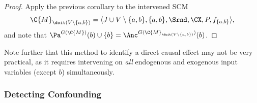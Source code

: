 \begin{proof}
  Apply the previous corollary to the intervened SCM 
  $$\C{M}_{\doit(V\setminus\{a,b\})} = \langle J \cup V \setminus \{a,b\}, \{a,b\}, \Srnd, \CX, P, f_{\{a,b\}} \rangle,$$
  and note that $\Pa^{G(\C{M})}(b) \cup \{b\} = \Anc^{G(\C{M}_{\doit(V\setminus\{a,b\})})}(b)$.
\end{proof}
Note further that this method to identify a direct causal effect may not be very practical,
as it requires intervening on \emph{all} endogenous and exogenous input variables (except $b$) simultaneously.
  
\subsubsection{Detecting Confounding}


